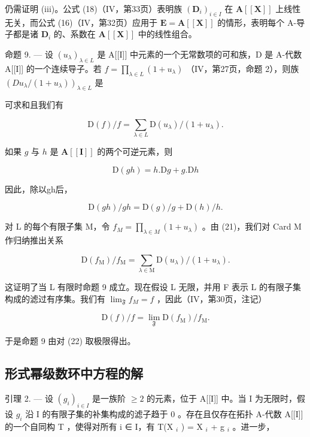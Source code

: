 仍需证明 (iii)。公式 (18)（IV，第33页）表明族 \((\mathbf{D}_i)_{i\in I}\) 在 \(\mathbf{A}[[\mathbf{X}]]\) 上线性无关，而公式 (16)（IV，第32页）应用于 \(\mathbf{E} = \mathbf{A}[[\mathbf{X}]]\) 的情形，表明每个 A-导子都是诸 \(\mathbf{D}_i\) 的、系数在 \(\mathbf{A}[[\mathbf{X}]]\) 中的线性组合。

命题 9. --- 设 \((u_{\lambda})_{\lambda \in L}\) 是 A{[}{[}I{]}{]} 中元素的一个无常数项的可和族，D 是 A-代数 A{[}{[}I{]}{]} 的一个连续导子。若 \(f = \prod_{\lambda \in L} (1 + u_{\lambda})\) （IV，第27页，命题 2），则族 \((D u_{\lambda} / (1 + u_{\lambda}))_{\lambda \in L}\) 是

可求和且我们有

\[
\mathrm{D} (f) / f = \sum_ {\lambda \in L} \mathrm{D} (u _ {\lambda}) / (1 + u _ {\lambda}).\tag{20}
\]

如果 \(g\) 与 \(h\) 是 \(\mathbf{A}[[\mathbf{I}]]\) 的两个可逆元素，则

\[
\mathrm{D} (g h) = h. \mathrm{D} g + g. \mathrm{D} h
\]

因此，除以gh后，

\[
\mathrm{D} (g h) / g h = \mathrm{D} (g) / g + \mathrm{D} (h) / h.\tag{21}
\]

对 L 的每个有限子集 M，令 \(f_{M} = \prod_{\lambda \in M} (1 + u_{\lambda})\) 。由 (21)，我们对 Card M 作归纳推出关系

\[
\mathrm{D} \left(f _ {\mathrm{M}}\right) / f _ {\mathrm{M}} = \sum_ {\lambda \in \mathrm{M}} \mathrm{D} \left(u _ {\lambda}\right) / \left(1 + u _ {\lambda}\right).\tag{22}
\]

这证明了当 L 有限时命题 9 成立。现在假设 L 无限，并用 F 表示 L 的有限子集构成的滤过有序集。我们有 \(\lim_{\mathfrak{F}} f_{M} = f\) ，因此（IV，第30页，注记）

\[
\mathrm{D} (f) / f = \lim _ {\mathfrak {F}} \mathrm{D} (f _ {\mathrm{M}}) / f _ {\mathrm{M}}.
\]

于是命题 9 由对 (22) 取极限得出。

\subsection{形式幂级数环中方程的解}

引理 2. --- 设 \((g_i)_{i \in I}\) 是一族阶 \(\geqslant 2\) 的元素，位于 A{[}{[}I{]}{]} 中。当 I 为无限时，假设 \(g_i\) 沿 I 的有限子集的补集构成的滤子趋于 0 。存在且仅存在拓扑 A-代数 A{[}{[}I{]}{]} 的一个自同构 T ，使得对所有 i ∈ I，有 T(X \(_i\) ) = X \(_i\) + g \(_i\) 。进一步，

